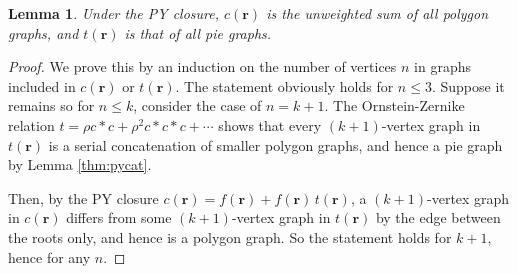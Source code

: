 \documentclass[aip,jcp,reprint,superscriptaddress]{revtex4-1}
\newtheorem{lemm}[thrm]{Lemma}
\newcommand{\vct}[1]{\mathbf{#1}}
\providecommand{\vr}{} %
\renewcommand{\vr}{\vct{r}}
\begin{document}
\begin{lemm}
Under the PY closure,
  $c(\vr)$ is the unweighted sum of
  all polygon graphs,
  and $t(\vr)$ is that of all pie graphs.
\label{thm:pycrsum}
\end{lemm}

\begin{proof}
We prove this by an induction on the number of vertices $n$ in
  graphs included in $c(\vr)$ or $t(\vr)$.
%
The statement obviously holds for $n \le 3$.
%
Suppose it remains so for $n \le k$,
consider the case of $n = k + 1$.
%
The Ornstein-Zernike relation
$t = \rho c * c + \rho^2 c * c * c + \cdots$
shows that every $(k+1)$-vertex graph in $t(\vr)$
  is a serial concatenation
  of smaller polygon graphs,
  and hence a pie graph
  by Lemma \ref{thm:pycat}.

Then, by the PY closure
$c(\vr) = f(\vr) + f(\vr) \, t(\vr)$,
a $(k+1)$-vertex graph in $c(\vr)$
  differs from some $(k+1)$-vertex graph in $t(\vr)$
  by the edge between the roots only,
  and hence is a polygon graph.
%
So the statement holds for $k+1$,
  hence for any $n$.
\end{proof}
\end{document}
